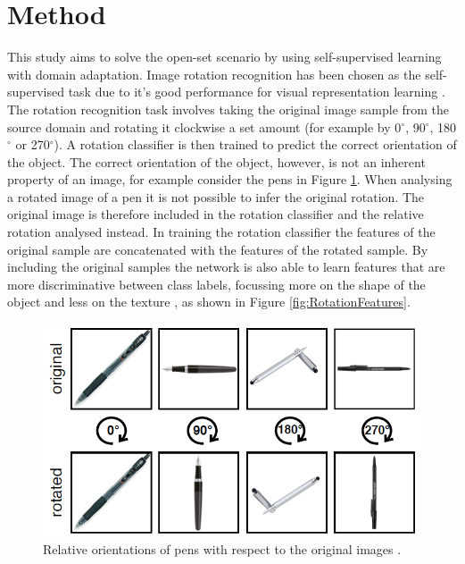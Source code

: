 \documentclass[10pt,twocolumn,letterpaper]{article}
\begin{document}
\section{Method}
\label{sec:method}

This study aims to solve the open-set scenario by using self-supervised learning with domain adaptation. Image rotation recognition has been chosen as the self-supervised task due to it's good performance for visual representation learning \cite{Xu2019, Gidaris2018}. The rotation recognition task involves taking the original image sample from the source domain and rotating it clockwise a set amount (for example by 0$^{\circ}$, 90$^{\circ}$, 180$^{\circ}$ or 270$^{\circ}$). A rotation classifier is then trained to predict the correct orientation of the object. The correct orientation of the object, however, is not an inherent property of an image, for example consider the pens in Figure \ref{fig:RotatedPens}. When analysing a rotated image of a pen it is not possible to infer the original rotation. The original image is therefore included in the rotation classifier and the relative rotation analysed instead. In training the rotation classifier the features of the original sample are concatenated with the features of the rotated sample. By including the original samples the network is also able to learn features that are more discriminative between class labels, focussing more on the shape of the object and less on the texture \cite{Bucci2020}, as shown in Figure \ref{fig:RotationFeatures}.

\begin{figure}[!htb]
  \centering
   \includegraphics[width=0.9\linewidth]{Figures/RotatedPens.png}
   \caption{Relative orientations of pens with respect to the original images \cite{Bucci2020}.}
   \label{fig:RotatedPens}
\end{figure}
\end{document}
